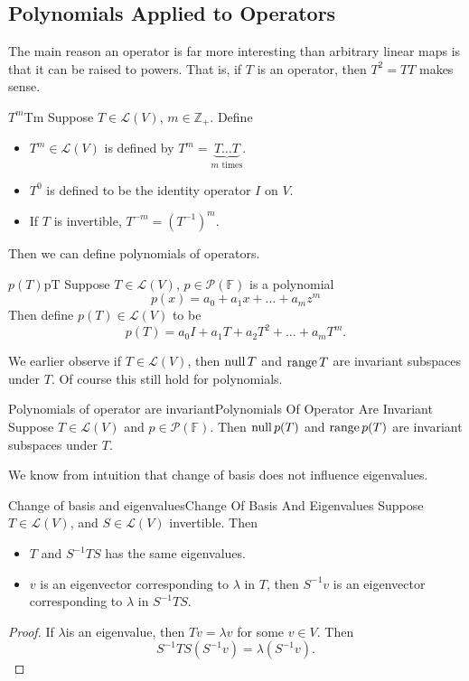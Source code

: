\documentclass[../main.tex]{subfiles}
\begin{document}
\subsection{Polynomials Applied to Operators}
The main reason an operator is far more interesting than arbitrary linear maps is that it can be raised to powers. That is, if $T$ is an operator, then $T^2=TT$ makes sense.

\begin{notation}{$T^m$}{Tm}
Suppose $T\in \mathscr{L}(V)$, $m\in \mathbb{Z}_+$. Define
\begin{itemize}
	\item $T^m\in \mathscr{L}(V)$ is defined by $T^m = \underbrace{T \ldots T}_{m \text{ times}}$.
	\item $T^0$ is defined to be the identity operator $I$ on $V$.
	\item If $T$ is invertible, $T^{-m} = \left(T ^{-1}\right)^m$.
\end{itemize}
\end{notation}

Then we can define polynomials of operators.
\begin{notation}{$p(T)$}{pT}
Suppose $T\in \mathscr{L}(V)$, $p\in \mathscr{P}(\mathbb{F})$ is a polynomial 
\begin{equation*}
p(x) = a_0+a_1x+\ldots +a_mz^m
\end{equation*}
Then define $p(T)\in \mathscr{L}(V)$ to be
\begin{equation*}
p(T) = a_0I+a_1T+a_2T^2+\ldots +a_mT^m.
\end{equation*}
\end{notation}

We earlier observe if $T\in \mathscr{L}(V)$, then $\operatorname{null} T$ and $\operatorname{range} T$ are invariant subspaces under $T$. Of course this still hold for polynomials.
\begin{theorem}{Polynomials of operator are invariant}{Polynomials Of Operator Are Invariant}
Suppose $T\in \mathscr{L}(V)$ and $p\in \mathscr{P}(\mathbb{F})$. Then $\operatorname{null} p(T)$ and $\operatorname{range} p(T)$ are invariant subspaces under $T$.
\end{theorem}

We know from intuition that change of basis does not influence eigenvalues.
\begin{theorem}{Change of basis and eigenvalues}{Change Of Basis And Eigenvalues}
Suppose $T\in \mathscr{L}(V)$, and $S\in \mathscr{L}(V)$ invertible. Then 
\begin{itemize}
\item $T$ and $S ^{-1}TS$ has the same eigenvalues.
\item $v$ is an eigenvector corresponding to $\lambda$ in $T$, then $S ^{-1}v$ is an eigenvector corresponding to $\lambda$ in $S ^{-1}TS$.
\end{itemize}
\end{theorem}
\begin{proof}
If $\lambda $is an eigenvalue, then $Tv = \lambda v$ for some $v\in V$. Then 
\begin{equation*}
S ^{-1}TS(S ^{-1}v) = \lambda (S ^{-1}v).
\end{equation*}
\end{proof}
\end{document}
